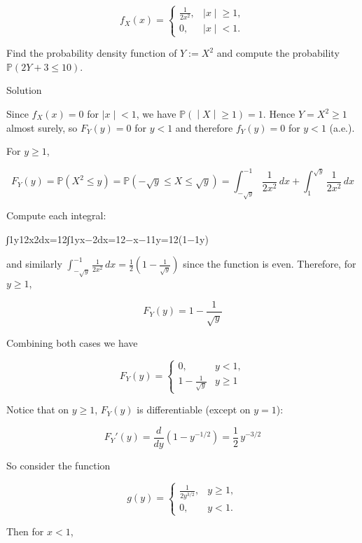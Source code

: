 \documentclass{qlnotes-export}
\begin{document}
\[f_{X}(x) = \left\{ \begin{matrix}
{\frac{1}{2x^{2}},} & \left. |x \middle| \geq 1, \right. \\
{0,} & \left. |x \middle| < 1. \right.
\end{matrix} \right.\]

Find the probability density function of \(Y := X^{2}\) and compute the probability \({\mathbb{P}}(2Y + 3 \leq 10)\).

\begin{qlsolution}{Solution}

Since \(f_{X}(x) = 0\) for \(\left. |x \middle| < 1 \right.\), we have \(\left. {\mathbb{P}}( \middle| X \middle| \geq 1) = 1 \right.\). Hence \(Y = X^{2} \geq 1\) almost surely, so \(F_{Y}(y) = 0\) for \(y < 1\) and therefore \(f_{Y}(y) = 0\) for \(y < 1\) (a.e.).

For \(y \geq 1\),

\[F_{Y}(y) = {\mathbb{P}}(X^{2} \leq y) = {\mathbb{P}}( - \sqrt{y} \leq X \leq \sqrt{y}) = \int_{- \sqrt{y}}^{- 1}\frac{1}{2x^{2}}\, dx + \int_{1}^{\sqrt{y}}\frac{1}{2x^{2}}\, dx\]

Compute each integral:

{∫1y12x2dx=12∫1yx−2dx=12−x−11y=12(1−1y)}

and similarly \(\int_{- \sqrt{y}}^{- 1}\frac{1}{2x^{2}}\, dx = \frac{1}{2}\left( {1 - \frac{1}{\sqrt{y}}} \right)\) since the function is even. Therefore, for \(y \geq 1\),

\[F_{Y}(y) = 1 - \frac{1}{\sqrt{y}}\]

Combining both cases we have

\[F_{Y}(y) = \left\{ \begin{matrix}
{0,} & {y < 1,} \\
{1 - \frac{1}{\sqrt{y}}} & {y \geq 1}
\end{matrix} \right.\]

Notice that on \(y \geq 1\), \(F_{Y}(y)\) is differentiable (except on \(y = 1\)):

\[F_{Y}'(y) = \frac{d}{dy}\left( {1 - y^{- 1/2}} \right) = \frac{1}{2}\, y^{- 3/2}\]

So consider the function

\[g(y) = \left\{ \begin{matrix}
{\frac{1}{2y^{3/2}},} & {y \geq 1,} \\
{0,} & {y < 1.}
\end{matrix} \right.\]

Then for \(x < 1\),


\end{qlsolution}
\end{document}
